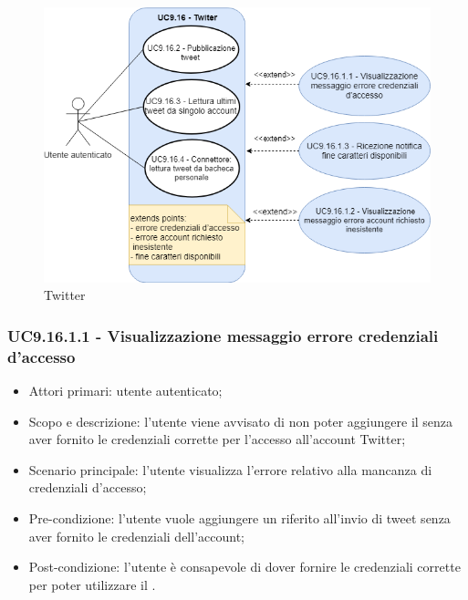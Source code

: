 \begin{figure}[H]
	\centering
	\includegraphics[width=14cm,keepaspectratio]{../includes/pics/connettore_twitter.png}
	\caption{\label{fig:mission} Twitter}
\end{figure}

\subsubsection{UC9.16.1.1 - Visualizzazione messaggio errore credenziali d'accesso}
\begin{itemize}
	\item  Attori primari: utente autenticato;
	\item  Scopo e descrizione: l'utente viene avvisato di non poter aggiungere il  senza aver fornito le credenziali corrette per l'accesso all'account Twitter;
	\item  Scenario principale: l'utente visualizza l'errore relativo alla mancanza di credenziali d'accesso;
	\item  Pre-condizione: l'utente vuole aggiungere un  riferito all'invio di tweet senza aver fornito le credenziali dell'account;
	\item  Post-condizione: l'utente è consapevole di dover fornire le credenziali corrette per poter utilizzare il .
\end{itemize}
